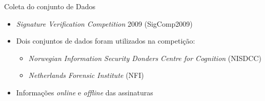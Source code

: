 \begin{frame}{Coleta do conjunto de Dados}
  \baselineskip
  \begin{itemize}
    \item \emph{Signature Verification Competition} 2009 (SigComp2009)
    \item Dois conjuntos de dados foram utilizados na competição:
    \begin{itemize}
      \item \emph{Norwegian Information Security Donders Centre for Cognition} (NISDCC)
      \item \emph{Netherlands Forensic Institute} (NFI)
    \end{itemize}
    \item Informações \emph{online} e \emph{offline} das assinaturas
  \end{itemize}

  \begin{table}[h!]
\centering
\caption{Quantitativo de indivíduos e assinaturas \emph{offline} por conjunto de dados.}
\label{tab:demonstracao-dataset}
\end{table}
\end{frame}

